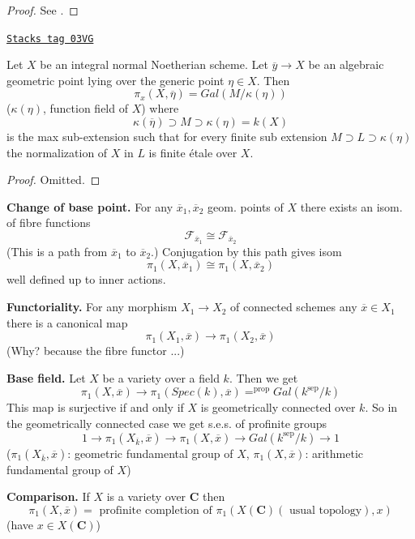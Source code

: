 \begin{proof}
See \cite{SGA1}.
\end{proof}

\begin{proposition}
\label{trace-proposition-integral-normal-fundamental-group}
\href{https://stacks.math.columbia.edu/tag/03VG}{\texttt{Stacks tag 03VG}}

Let $X$ be an integral normal Noetherian scheme. Let
$\overline y\to X$ be an algebraic geometric point lying
over the generic point $\eta\in X$. Then
$$
\pi_x(X, \overline \eta) = Gal(M/\kappa(\eta))
$$
($\kappa(\eta)$, function field of $X$) where
$$
\kappa(\overline \eta)\supset M\supset \kappa(\eta) = k(X)
$$
is the max sub-extension such that for every finite sub extension
$M\supset L\supset \kappa(\eta)$ the normalization of $X$ in $L$ is finite
\'etale over $X$.
\end{proposition}

\begin{proof}
Omitted.
\end{proof}

{\bf Change of base point.} For any $\overline{x}_1, \overline{x}_2$
geom. points of $X$ there exists an isom. of fibre functions
$$
\mathcal{F}_{\overline{x}_1} \cong \mathcal{F}_{\overline{x}_2}
$$
(This is a path from $\overline{x}_1$ to $\overline{x}_2$.) Conjugation
by this path gives isom
$$
\pi_1(X, \overline{x}_1) \cong \pi_1(X, \overline{x}_2)
$$
well defined up to inner actions.

\medskip\noindent
{\bf Functoriality.} For any morphism $X_1\to X_2$ of connected schemes
any $\overline{x}\in X_1$ there is a canonical map
$$
\pi_1(X_1, \overline{x}) \to \pi_1(X_2, \overline{x})
$$
(Why? because the fibre functor ...)

\medskip\noindent
{\bf Base field.} Let $X$ be a variety over a field $k$. Then we get
$$
\pi_1(X, \overline{x}) \to
\pi_1(Spec(k), \overline{x}) =^{\text{prop}} Gal(k^{\text{sep}}/k)
$$
This map is surjective if and only if $X$ is geometrically connected over $k$.
So in the geometrically connected case we get s.e.s. of profinite
groups
$$
1 \to \pi_1(X_{\overline{k}}, \overline{x}) \to
\pi_1(X, \overline{x}) \to
Gal(k^{\text{sep}}/k) \to 1
$$
($\pi_1(X_{\overline{k}}, \overline{x})$: geometric fundamental group of
$X$, $\pi_1(X, \overline{x})$: arithmetic fundamental group of $X$)

\medskip\noindent
{\bf Comparison.} If $X$ is a variety over $\mathbf{C}$ then
$$
\pi_1(X, \overline{x}) =
\text{ profinite completion of }
\pi_1(X(\mathbf{C})(\text{ usual topology}), x)
$$
(have $x\in X(\mathbf{C})$)

